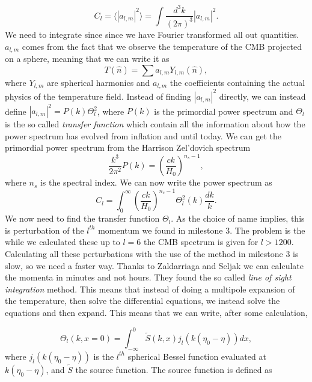 \documentclass[a4paper,norsk, 10pt]{article}
\begin{document}
\begin{equation}
C_l = \langle |a_{l,m}|^2\rangle = \int \frac{d^3 k}{(2\pi)^3}|a_{l,m}|^2.
\end{equation}
We need to integrate since since we have Fourier transformed all out quantities. $a_{l,m}$ comes from the fact that we observe the temperature of the CMB projected on a sphere, meaning that we can write it as 
\begin{equation}
T(\hat{n}) = \sum a_{l,m} Y_{l,m}(\hat{n}),
\end{equation}
where $Y_{l,m}$ are spherical harmonics and $a_{l,m}$ the coefficients containing the actual physics of the temperature field. Instead of finding $|a_{l,m}|^2$ directly, we can instead define $|a_{l,m}|^2 = P(k)\Theta_l^2$, where $P(k)$ is the primordial power spectrum and $\Theta_l$ is the so called \textit{transfer function} which contain all the information about how the power spectrum has evolved from inflation and until today. We can get the primordial power spectrum from the Harrison Zel'dovich spectrum 
\begin{equation}
\frac{k^3}{2\pi^2}P(k) = \left(\frac{ck}{H_0}\right)^{n_s - 1},
\end{equation}
where $n_s$ is the spectral index. We can now write the power spectrum as
\begin{equation}\label{eq:Cl}
C_l = \int^{\infty}_{0}\left(\frac{ck}{H_0}\right)^{n_s - 1} \Theta_l^2(k) \frac{dk}{k}.
\end{equation}
We now need to find the transfer function $\Theta_l$. As the choice of name implies, this is perturbation of the $l^{th}$ momentum we found in milestone 3. The problem is the while we calculated these up to $l = 6$ the CMB spectrum is given for $l>1200$. Calculating all these perturbations with the use of the method in milestone 3 is slow, so we need a faster way. Thanks to Zaldarriaga and Seljak we can calculate the momenta in minutes and not hours. They found the so called \textit{line of sight integration} method. This means that instead of doing a multipole expansion of the temperature, then solve the differential equations, we instead solve the equations and then expand. This means that we can write, after some calculation,

\begin{equation}\label{eq:Theta}
\Theta_l(k,x=0) = \int_{-\infty}^{0} \tilde{S}(k,x)j_l(k(\eta_0 - \eta)) dx,
\end{equation}
where $j_l(k(\eta_0 - \eta))$ is the $l^{th}$ spherical Bessel function evaluated at $k(\eta_0 - \eta)$, and $\tilde{S}$ the source function. The source function is defined as
\end{document}
